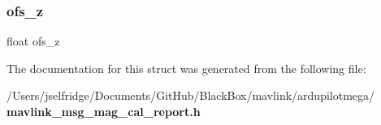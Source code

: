 \mbox{\label{struct____mavlink__mag__cal__report__t_aa0cfe73458b3635c93f60b0a0fe60baa}} 
\subsubsection{ofs\+\_\+z}
{\footnotesize\ttfamily float ofs\+\_\+z}



The documentation for this struct was generated from the following file\+:\begin{DoxyCompactItemize}
\item 
/\+Users/jselfridge/\+Documents/\+Git\+Hub/\+Black\+Box/mavlink/ardupilotmega/\textbf{ mavlink\+\_\+msg\+\_\+mag\+\_\+cal\+\_\+report.\+h}\end{DoxyCompactItemize}
